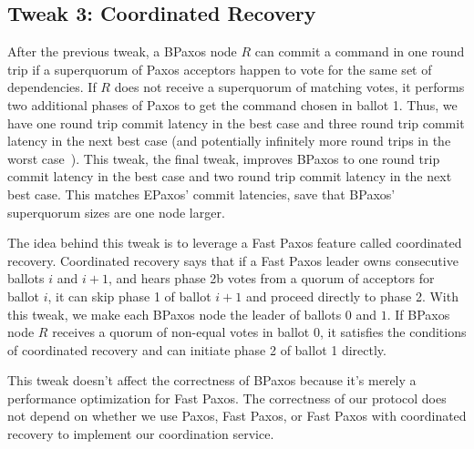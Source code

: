 \documentclass{mwhittaker}
\begin{document}
\subsection{Tweak 3: Coordinated Recovery}
After the previous tweak, a BPaxos node $R$ can commit a command in one round
trip if a superquorum of Paxos acceptors happen to vote for the same set of
dependencies. If $R$ does not receive a superquorum of matching votes, it
performs two additional phases of Paxos to get the command chosen in ballot 1.
Thus, we have one round trip commit latency in the best case and three round
trip commit latency in the next best case (and potentially infinitely more
round trips in the worst case~\cite{fischer1982impossibility}). This tweak, the
final tweak, improves BPaxos to one round trip commit latency in the best case
and two round trip commit latency in the next best case. This matches EPaxos'
commit latencies, save that BPaxos' superquorum sizes are one node larger.

The idea behind this tweak is to leverage a Fast Paxos feature called
coordinated recovery. Coordinated recovery says that if a Fast Paxos leader
owns consecutive ballots $i$ and $i + 1$, and hears phase 2b votes from a
quorum of acceptors for ballot $i$, it can skip phase 1 of ballot $i + 1$ and
proceed directly to phase 2. With this tweak, we make each BPaxos node the
leader of ballots $0$ and $1$. If BPaxos node $R$ receives a quorum of
non-equal votes in ballot $0$, it satisfies the conditions of coordinated
recovery and can initiate phase 2 of ballot 1 directly.

This tweak doesn't affect the correctness of BPaxos because it's merely a
performance optimization for Fast Paxos. The correctness of our protocol does
not depend on whether we use Paxos, Fast Paxos, or Fast Paxos with coordinated
recovery to implement our coordination service.



\end{document}
